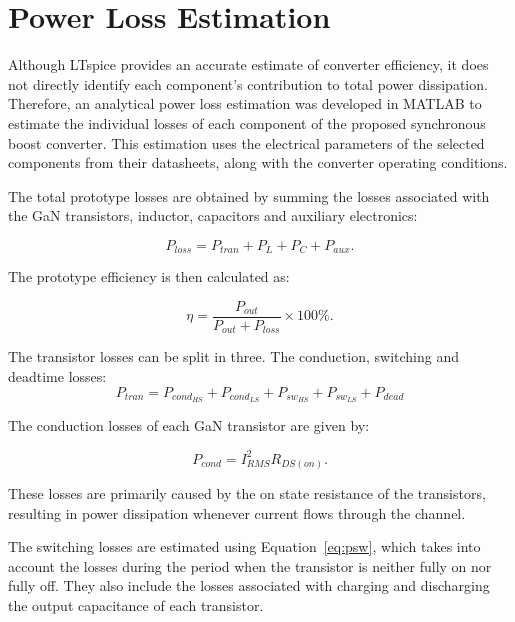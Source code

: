     \section{Power Loss Estimation}
        \label{subsubsec:loss_estimation}

        Although LTspice provides an accurate estimate of converter efficiency, it does not directly identify each component's contribution to total power dissipation. Therefore, an analytical power loss estimation was developed in MATLAB to estimate the individual losses of each component of the proposed synchronous boost converter. This estimation uses the electrical parameters of the selected components from their datasheets, along with the converter operating conditions.

        The total prototype losses are obtained by summing the losses associated with the GaN transistors, inductor, capacitors and auxiliary electronics:

        \begin{equation}
        P_{loss}=P_{tran}+P_{L}+P_{C}+P_{aux}.
        \end{equation}

        The prototype efficiency is then calculated as:

        \begin{equation}
        \eta=\frac{P_{out}}{P_{out}+P_{loss}}\times100\%.
        \end{equation}

        The transistor losses can be split in three. The conduction, switching and deadtime losses:
        \begin{equation}
            P_{tran}=P_{cond_{HS}}+P_{cond_{LS}}+P_{sw_{HS}}+P_{sw_{LS}}+P_{dead}
        \end{equation}

        The conduction losses of each GaN transistor are given by:

        \begin{equation}
        P_{cond}=I_{RMS}^{2}R_{DS(on)}.
        \end{equation}

        These losses are primarily caused by the on state resistance of the transistors, resulting in power dissipation whenever current flows through the channel. 

        The switching losses are estimated using Equation~\ref{eq:psw}, 
        which takes into account the losses during the period when the transistor is neither fully on nor fully off. They also include the losses associated with charging and discharging the output capacitance of each transistor.

